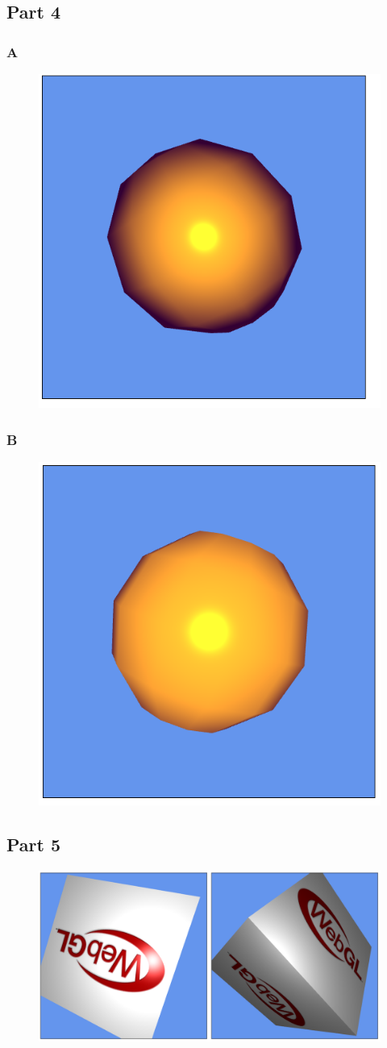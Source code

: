 \documentclass[11pt]{article}
\begin{document}
\subsection{Part 4}
\subsubsection{A}
\begin{figure}[H]
	\centering
	\includegraphics[width=0.5\linewidth]{images/e12p4a}
	\label{fig:e12p4a}
\end{figure}

\subsubsection{B}
\begin{figure}[H]
	\centering
	\includegraphics[width=0.5\linewidth]{images/e12p4b}
	\label{fig:e12p4b}
\end{figure}

\subsection{Part 5}
\begin{figure}[H]
	\centering
	\includegraphics[width=0.5\linewidth]{images/e12p5}
	\label{fig:e12p5}
\end{figure}
\end{document}
